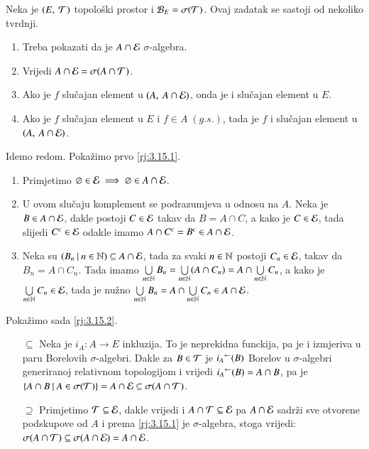 \begin{rj}[\ref{zad:3.15}]  \label{rj:3.15}
    Neka je $({E}, \: {\mathcal{T}})$ topolo\v ski prostor i $\mathcal{B}_{E} = \sigma({\mathcal{T}})$.
    Ovaj zadatak se sastoji od nekoliko tvrdnji.
    \begin{enumerate}[label=(\arabic*)]
        \item \label{rj:3.15.1}
        Treba pokazati da je $ A \cap \mathcal{E}$ $\sigma$-algebra.
        \item \label{rj:3.15.2}
        Vrijedi $A \cap \mathcal{E} = \sigma({A \cap \mathcal{T}})$.
        \item \label{rj:3.15.3}
        Ako je $f$ slu\v cajan element u $({A}, \: {A \cap \mathcal{E}})$, onda je i slu\v cajan element u $E$.
        \item \label{rj:3.15.4}
        Ako je $f$ slu\v cajan element u $E$ i $f \in A \; (g.s.)$, tada je $f$ i slu\v cajan element u $({A}, \: {A \cap \mathcal{E}})$.
    \end{enumerate}
    Idemo redom.
    Poka\v zimo prvo \ref{rj:3.15.1}.
    \begin{enumerate}[label=(\roman*)]
        \item Primjetimo $\varnothing \in \mathcal{E} \implies \varnothing \in A \cap \mathcal{E}$.
        \item U ovom slu\v caju komplement se podrazumjeva u odnosu na $A$.
        Neka je $B \in A \cap \mathcal{E}$, dakle postoji $C \in \mathcal{E}$ takav da $B = A \cap C$, a kako je $C \in \mathcal{E}$, tada slijedi $C^c \in \mathcal{E}$ odakle imamo $A \cap C^c = B^c \in A \cap \mathcal{E}$.
        \item Neka su $({B_n} \: | \: {n \in \mathbb{N}}) \subseteq A \cap \mathcal{E}$, tada za svaki $n \in \mathbb{N}$ postoji $C_n \in \mathcal{E}$, takav da $B_n = A \cap C_n$.
        Tada imamo $\bigcup\limits_{n \in \mathbb{N}}^{} B_n = \bigcup\limits_{n \in \mathbb{N}}^{} (A \cap C_n) = A \cap \bigcup\limits_{n \in \mathbb{N}}^{} C_n$, a kako je $\bigcup\limits_{n \in \mathbb{N}}^{} C_n \in \mathcal{E}$, tada je nu\v zno $\bigcup\limits_{n \in \mathbb{N}}^{} B_n = A \cap \bigcup\limits_{n \in \mathbb{N}}^{} C_n \in A \cap \mathcal{E}$.
    \end{enumerate}

    Poka\v zimo sada \ref{rj:3.15.2}.
    \begin{itemize}
        \item[$\subseteq$] Neka je $i_A : A \to E$ inkluzija.
        To je neprekidna funckija, pa je i izmjeriva u paru Borelovih $\sigma$-algebri.
        Dakle za $B \in \mathcal{T}$ je ${i_A}^{\leftarrow}(B)$ Borelov u $\sigma$-algebri generiranoj relativnom topologijom i vrijedi ${i_A}^{\leftarrow}(B) = A \cap B$, pa je\\
        $\{{A \cap B} \: | \: {A \in \sigma({\mathcal{T}})}\} = A \cap \mathcal{E} \subseteq \sigma({A \cap \mathcal{T}})$.
        \item[$\supseteq$] Primjetimo $\mathcal{T} \subseteq \mathcal{E}$, dakle vrijedi i $A \cap \mathcal{T} \subseteq \mathcal{E}$ pa $A \cap \mathcal{E}$ sadr\v zi sve otvorene podskupove od $A$ i prema \ref{rj:3.15.1} je $\sigma$-algebra, stoga vrijedi:\\
        $\sigma({A \cap \mathcal{T}}) \subseteq \sigma({A \cap \mathcal{E}}) = A \cap \mathcal{E}$.
    \end{itemize}
    

\end{rj}
